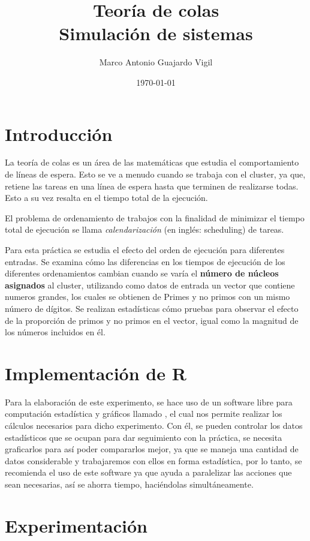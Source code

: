 \documentclass{article}
\author{Marco Antonio Guajardo Vigil}
\title{\textbf{Teor\'ia de colas} \\ Simulaci\'on de sistemas}
\date{\today}
\begin{document}
\maketitle

\section{Introducci\'on}

La teor\'ia de colas \cite{satuP3} es un \'area de las matem\'aticas que estudia el comportamiento de l\'ineas de espera. Esto se ve a menudo cuando se trabaja con el cluster, ya que, retiene las tareas en una l\'inea de espera hasta que terminen de realizarse todas. Esto a su vez resalta en el tiempo total de la ejecuci\'on.

El problema de ordenamiento de trabajos con la finalidad de minimizar el tiempo total de ejecuci\'on se llama \textit{calendarizaci\'on} (en ingl\'es: scheduling) de tareas.

Para esta pr\'actica se estudia el efecto del orden de ejecuci\'on para diferentes entradas. Se examina c\'omo las diferencias en los tiempos de ejecuci\'on de los diferentes ordenamientos cambian cuando se var\'ia el \textbf{n\'umero de n\'ucleos asignados} al cluster, utilizando como datos de entrada un vector que contiene numeros grandes, los cuales se obtienen de Primes \cite{Primes} y no primos con un mismo n\'umero de d\'igitos. Se realizan estad\'isticas c\'omo pruebas para observar el efecto de la proporci\'on de primos y no primos en el vector, igual como la magnitud de los n\'umeros incluidos en \'el.

\section{Implementaci\'on de R}
Para la elaboraci\'on de este experimento, se hace uso de un software libre para computaci\'on estad\'istica y gr\'aficos llamado \citet{R}, el cual nos permite realizar los c\'alculos necesarios para dicho experimento. Con \'el, se pueden controlar los datos estad\'isticos que se ocupan para dar seguimiento con la pr\'actica, se necesita graficarlos para as\'i poder compararlos mejor, ya que se maneja una cantidad de datos considerable y trabajaremos con ellos en forma estad\'istica, por lo tanto, se recomienda el uso de este software ya que ayuda a paralelizar las acciones que sean necesarias, as\'i se ahorra tiempo, haci\'endolas simult\'aneamente.

\section{Experimentaci\'on}
\end{document}
